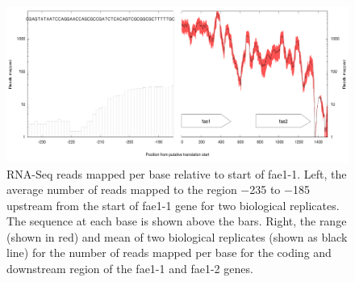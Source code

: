 \begin{figure}[H]
\centering
     \includegraphics[width=1.0\textwidth]{./tex/chapter1/figures/supplemental/FigureS5.png}
     \begin{singlespace}
     \caption[RNA-Seq reads mapped per base relative to start of fae1-1.]{
        RNA-Seq reads mapped per base relative to start of fae1-1.
        Left, the average number of reads mapped to the region −235 to −185 upstream from the start of fae1-1 gene for two biological replicates.
        The sequence at each base is shown above the bars.
        Right, the range (shown in red) and mean of two biological replicates (shown as black line) for the number of reads mapped per base for the coding and downstream region
            of the fae1-1 and fae1-2 genes.
        }
     \label{fig:S5} %
     \end{singlespace}
\end{figure}


